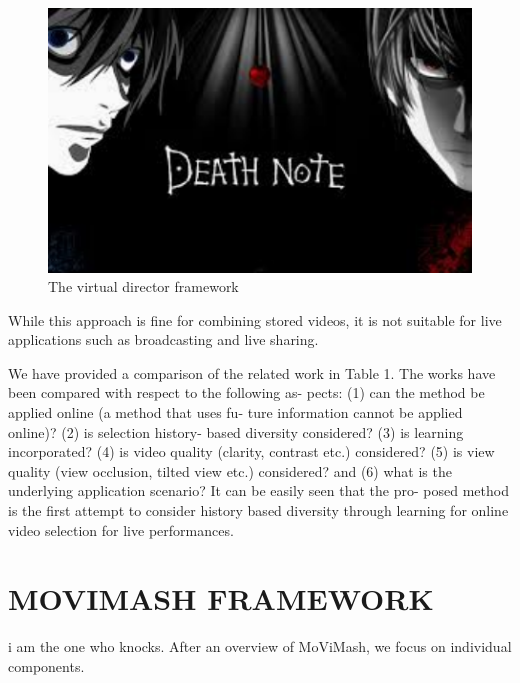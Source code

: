 \documentclass{sig-alternate-05-2015}
\begin{document}
\begin{figure}
\centering
\includegraphics{note.pdf}
\caption{The virtual director framework}
\end{figure}
While this approach is fine for combining stored videos, it is not suitable for live applications
such as broadcasting and live sharing.\par
We have provided a comparison of the related work in Table 1.
The works have been compared with respect to the following as-
pects: (1) can the method be applied online (a method that uses fu-
ture information cannot be applied online)? (2) is selection history-
based diversity considered? (3) is learning incorporated? (4) is
video quality (clarity, contrast etc.) considered? (5) is view quality
(view occlusion, tilted view etc.) considered? and (6) what is the
underlying application scenario? It can be easily seen that the pro-
posed method is the first attempt to consider history based diversity
through learning for online video selection for live performances.

\section{MOVIMASH FRAMEWORK}
i am the one who knocks. After an overview of MoViMash, we focus on individual components.
\end{document}
